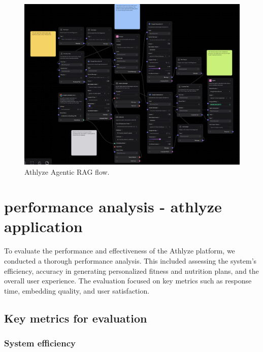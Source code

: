 \documentclass[conference]{IEEEtran}
\begin{document}
\begin{figure}[h!]
    \centering
    \includegraphics[width=0.95\linewidth]{Final_Flow.png}
    \caption{Athlyze Agentic RAG flow.}
    \label{fig:RAG}
\end{figure}

\section{performance analysis - athlyze application}

To evaluate the performance and effectiveness of the Athlyze platform, we conducted a thorough performance analysis. This included assessing the system's efficiency, accuracy in generating personalized fitness and nutrition plans, and the overall user experience. The evaluation focused on key metrics such as response time, embedding quality, and user satisfaction.

\subsection{Key metrics for evaluation}

\subsubsection{System efficiency}
\end{document}
